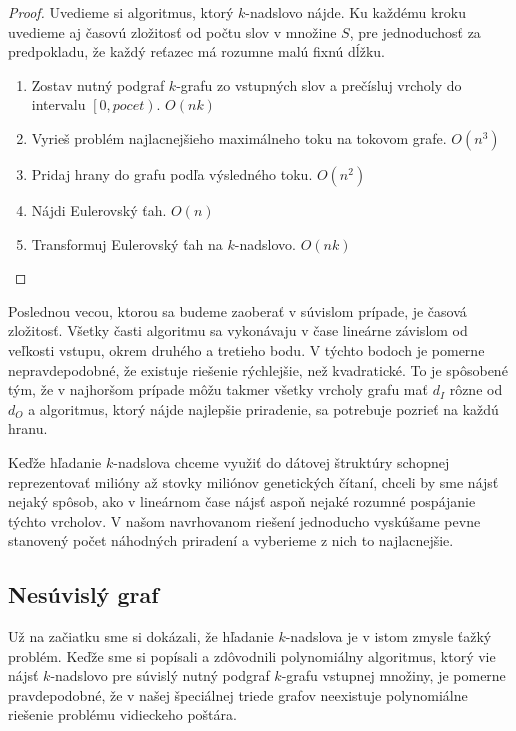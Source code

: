 \begin{proof}
    Uvedieme si algoritmus, ktorý $k$-nadslovo nájde. Ku každému kroku uvedieme aj časovú zložitosť od počtu slov v
    množine $S$, pre jednoduchosť za predpokladu, že každý reťazec má rozumne malú fixnú dĺžku.
    \begin{enumerate}
        \item Zostav nutný podgraf $k$-grafu zo vstupných slov a prečísluj vrcholy do intervalu $\left[0, pocet\right)$. $O(nk)$
        \item Vyrieš problém najlacnejšieho maximálneho toku na tokovom grafe. $O(n^3)$
        \item Pridaj hrany do grafu podľa výsledného toku. $O(n^2)$
        \item Nájdi Eulerovský ťah. $O(n)$
        \item Transformuj Eulerovský ťah na $k$-nadslovo. $O(nk)$ \qedhere
    \end{enumerate}
\end{proof}

Poslednou vecou, ktorou sa budeme zaoberať v súvislom prípade, je časová zložitosť. Všetky časti
algoritmu sa vykonávaju v čase lineárne závislom od veľkosti vstupu, okrem druhého a tretieho bodu.
V týchto bodoch je pomerne nepravdepodobné, že existuje riešenie rýchlejšie, než kvadratické. To je
spôsobené tým, že v najhoršom prípade môžu takmer všetky vrcholy grafu mať $d_I$ rôzne od $d_O$
a algoritmus, ktorý nájde najlepšie priradenie, sa potrebuje pozrieť na každú hranu.

Keďže hľadanie
$k$-nadslova chceme využiť do dátovej štruktúry schopnej reprezentovať milióny až stovky miliónov
genetických čítaní, chceli by sme nájsť nejaký spôsob, ako v lineárnom čase nájsť aspoň nejaké rozumné
pospájanie týchto vrcholov. V našom navrhovanom riešení jednoducho vyskúšame pevne stanovený počet
náhodných priradení a vyberieme z nich to najlacnejšie.

\subsection{Nesúvislý graf}

Už na začiatku sme si dokázali, že hľadanie $k$-nadslova je v istom zmysle ťažký problém. Keďže
sme si popísali a zdôvodnili polynomiálny algoritmus, ktorý vie nájsť $k$-nadslovo pre súvislý
nutný podgraf $k$-grafu vstupnej množiny, je pomerne pravdepodobné, že v našej špeciálnej
triede grafov neexistuje polynomiálne riešenie problému vidieckeho poštára.

